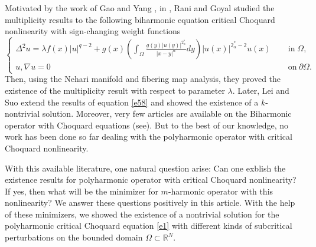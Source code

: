 \documentclass[reqno]{amsart}
\newcommand{\DD} {\displaystyle}
\newcommand{\la} {\lambda}
\newcommand{\Om}{\Omega}
\newcommand{\al} {\alpha}
\newcommand{\noi} {  \noindent}
\newcommand{\mb} {\mathbb}
\numberwithin{theorem}{section} \numberwithin{equation}{section}
\begin{document}
\vspace{.2cm}
\noi Motivated by the work of Gao and Yang \cite{37article, 1gao2017nonlocal}, in \cite{43rani2022multiple}, Rani and Goyal  
studied the multiplicity results to the following biharmonic equation  critical Choquard nonlinearity with sign-changing weight functions
\begin{equation} \label{e58}
 \begin{cases}
\Delta^2 u = \la f(x) |u|^{q-2} +g(x)\left(\DD\int_{\Om}\frac{g(y)|u(y)|^{2_{\al}^{*}}}{|x-y|^{\al}}dy\right)  {|u(x)|^{2_{\al}^{*}-2} u(x)} \quad \;& \text{in}\; \Om,\\
u, \nabla u=0\   &\text{on}\ \partial\Om.
\end{cases}   
\end{equation}
Then, using the Nehari manifold and fibering map analysis, they proved the existence of the multiplicity result with respect to parameter $\lambda$. Later, Lei and Suo \cite{41lei2025multiple} extend the results of equation \eqref{e58}
 and showed the existence of a $k$-nontrivial solution. Moreover, very few articles are available on the Biharmonic operator with Choquard equations (see\cite{42ji2026normalized,51liu2024existence}). But to the best of our knowledge, no work has been done so far dealing with the polyharmonic operator with critical Choquard nonlinearity. 

 \vspace{.07cm}
\noi With this available literature, one natural question arise: Can one exblish the existence results for polyharmonic operator with critical Choquard nonlinearity? If yes, then what will be the minimizer for $m$-harmonic operator with this nonlinearity? We answer these questions positively in this article.  With the help of these minimizers, we showed the existence of a nontrivial solution for the polyharmonic critical Choquard equation \eqref{e1} with different kinds of subcritical perturbations on the bounded domain $\Om \subset \mb{R}^N$. 
\end{document}
